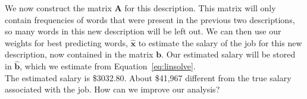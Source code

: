 \documentclass[12pt]{article}
\begin{document}
    \begin{center} 
        
        
    \end{center}

    We now construct the matrix $\bm{A}$ for this description. This matrix will
    only contain frequencies of words that were present in the previous two
    descriptions, so many words in this new description will be left out. We
    can then use our weights for best predicting words, $\bm{\hat{x}}$ to
    estimate the salary of the job for this new description, now contained in
    the matrix $\bm{b}$. Our estimated salary will be stored in $\bm{\hat{b}}$,
    which we estimate from Equation~\ref{eq:linsolve}. \\

    The estimated salary is \$3032.80. About \$41,967 different from the true %
    salary associated with the job. How can we improve our analysis?

\end{document}
